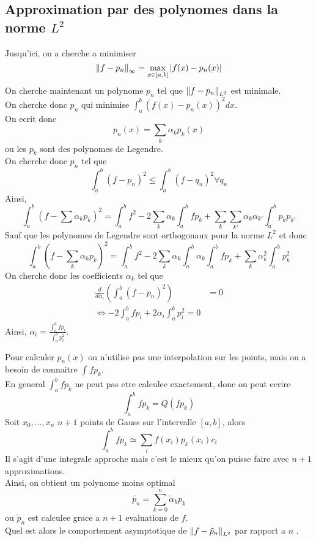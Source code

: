\documentclass[../main.tex]{subfiles}
\begin{document}
\subsection{Approximation par des polynomes dans la norme $L^{2}$ }
Jusqu'ici, on a cherche a minimiser 
\[ 
\left\lVert f-p_n\right\rVert _{ \infty }  = \max_{x\in [ a,b] }  |f( x) - p_n( x) |
\]
On cherche maintenant un polynome $p_n$ tel que $ \left\lVert f- p_n\right\rVert_{ L^{2}} $ est minimale.\\
On cherche donc $p_n$ qui minimise $ \int_{ a }^{ b } ( f( x) - p_n( x) )^{2} dx$.\\
On ecrit donc
\[ 
p_n( x) = \sum_k \alpha_k p_k( x) 
\]
ou les $p_k$ sont des polynomes de Legendre.\\
On cherche donc $p_n$ tel que
\[ 
\int_{ a }^{ b } ( f-p_n) ^{2} \leq  \int_{ a }^{ b } ( f-q_n) ^{2} \forall q_n
\]
Ainsi,
\[ 
\int_{ a }^{ b } ( f- \sum \alpha_k p_k)^{2} = \int_{ a }^{ b } f^{2} - 2 \sum_k \alpha_k \int_{ a }^{ b } f p_k + \sum_k \sum_{ k'} \alpha_k \alpha_{ k'} \int_{ a }^{ b } p_k p_{k'} 
\]
Sauf que les polynomes de Legendre sont orthogonaux pour la norme $L^{2}$ et donc
\[ 
\int_{ a }^{ b } ( f- \sum_k \alpha_k p_k) ^{2} = \int_{ a }^{ b } f^{2} - 2\sum_k \alpha_k \int_{ a }^{ b } \alpha_k \int_{ a }^{ b } f p_k + \sum_k \alpha_k^{2} \int_{ a }^{ b } p_k^{2}
\]
On cherche donc les coefficients $\alpha_k$ tel que
\begin{align*}
	\frac{d}{d \alpha_i} ( \int_{ a }^{ b } ( f- p_n)^{2}) &= 0\\
\iff -2 \int_{ a }^{ b } f p_i + 2 \alpha_i  \int_{ a }^{ b }p_i ^{2}=0
\end{align*}
Ainsi, $\alpha_i = \frac{ \int_{ a }^{ b } f p_i}{\int_{ a }^{ b } p_i ^{2}}$.\\
\begin{rmq}
Pour calculer $p_n( x) $ on n'utilise pas une interpolation sur les points, mais on a besoin de connaitre $ \int_{  }^{  } f p_k$.\\
En general $ \int_{ a }^{ b } f p_k $ ne peut pas etre calculee exactement, donc on peut ecrire
\[ 
\int_{ a }^{ b } f p_k = Q( f p_k) 
\]
Soit $x_0,\ldots,x_n$ $n+1$ points de Gauss sur l'intervalle $ [ a,b] $, alors 
\[ 
\int_{ a }^{ b } fp_k \simeq \sum_i f( x_i)  p_k( x_i) c_i
\]
Il s'agit d'une integrale approche mais c'est le mieux qu'on puisse faire avec $n+1$ approximations.\\
Ainsi, on obtient un polynome moins optimal
\[ 
	\tilde{p_n} = \sum_{k=0}^{n}\tilde { \alpha}_k p_k
\]
ou $\tilde { p} _n$ est calculee grace a $n+1$ evaluations de $f$.\\

Quel est alors le comportement asymptotique de $ \left\lVert f- \tilde { p} _n\right\rVert_{ L^{2}} $ par rapport a $n$ .
\end{rmq}




	

	
\end{document}
